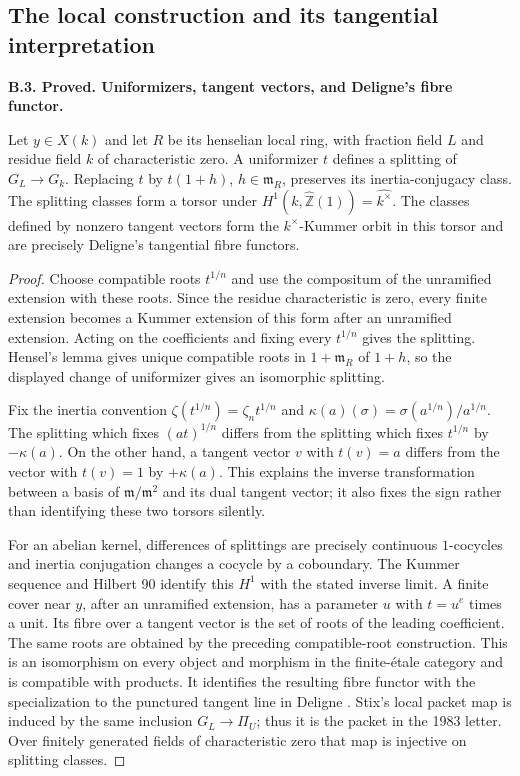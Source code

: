 \documentclass[11pt,oneside]{article}
\makeatletter
\newcounter{statementanchor}
\newenvironment{statement}[3]{%
 \refstepcounter{statementanchor}\def\@currentlabel{#1}%
 \par\addvspace{9pt}\noindent
 \textbf{#1. #2. #3.}\par\nobreak\noindent\ignorespaces
}{\par\addvspace{5pt}}
\makeatother
\begin{document}
\subsection{The local construction and its tangential interpretation}

\begin{statement}{B.3}{Proved}{Uniformizers, tangent vectors, and Deligne's fibre functor}
\label{st:B.3}

Let $y\in X(k)$ and let $R$ be its henselian local ring, with fraction
field $L$ and residue field $k$ of characteristic zero.  A uniformizer
$t$ defines a splitting of $G_L\to G_k$.  Replacing $t$ by $t(1+h)$,
$h\in\mathfrak m_R$, preserves its inertia-conjugacy class.  The
splitting classes form a torsor under
$H^1(k,\widehat{\mathbb Z}(1))=\widehat{k^\times}$.
The classes defined by nonzero tangent vectors form the
$k^\times$-Kummer orbit in this torsor and are precisely Deligne's
tangential fibre functors.
\end{statement}
\begin{proof}
Choose compatible roots $t^{1/n}$ and use the compositum of the
unramified extension with these roots.  Since the residue characteristic
is zero, every finite extension becomes a Kummer extension of this
form after an unramified extension.  Acting on the coefficients and
fixing every $t^{1/n}$ gives the splitting.  Hensel's lemma gives unique
compatible roots in $1+\mathfrak m_R$ of $1+h$, so the displayed change
of uniformizer gives an isomorphic splitting.

Fix the inertia convention
$\zeta(t^{1/n})=\zeta_n t^{1/n}$ and
$\kappa(a)(\sigma)=\sigma(a^{1/n})/a^{1/n}$.
The splitting which fixes $(at)^{1/n}$ differs from the splitting which
fixes $t^{1/n}$ by $-\kappa(a)$.  On the other hand, a tangent vector $v$
with $t(v)=a$ differs from the vector with $t(v)=1$ by $+\kappa(a)$.
This explains the inverse transformation between a basis of
$\mathfrak m/\mathfrak m^2$ and its dual tangent vector; it also fixes
the sign rather than identifying these two torsors silently.

For an abelian kernel, differences of splittings are precisely continuous
$1$-cocycles and inertia conjugation changes a cocycle by a coboundary.
The Kummer sequence and Hilbert 90 identify this $H^1$ with the stated
inverse limit.  A finite cover near $y$, after an unramified extension,
has a parameter $u$ with $t=u^e$ times a unit.  Its fibre over a tangent
vector is the set of roots of the leading coefficient.  The same roots
are obtained by the preceding compatible-root construction.  This is
an isomorphism on every object and morphism in the finite-\'etale
category and is compatible with products.  It identifies the resulting
fibre functor with the specialization to the punctured tangent line
in Deligne \cite[\S15.13--15.26]{B_Deligne}.
Stix's local packet map \cite[Proposition 8 and Theorem 14]{B_StixCuspidal}
is induced by the same inclusion $G_L\to\Pi_U$; thus it is the packet
in the 1983 letter.  Over finitely generated fields of characteristic
zero that map is injective on splitting classes.
\end{proof}
\end{document}
